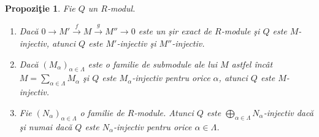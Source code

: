\documentclass[12pt,a4paper]{book}
\theoremstyle{plain}
\newtheorem{proposition}[theorem]{Propoziţie}
\theoremstyle{definition}
\theoremstyle{remark}
\begin{document}
\begin{proposition}
Fie \(Q\) un \(R\)-modul.
\begin{enumerate}
  \item Dacă \(0 \to M' \xrightarrow{f} M \xrightarrow{g} M'' \to 0\) este
        un şir exact de \(R\)-module şi \(Q\) este \(M\)-injectiv,
        atunci \(Q\) este \(M'\)-injectiv şi \(M''\)-injectiv.
  \item Dacă \((M_\alpha)_{\alpha \in \Lambda}\) este o familie de submodule ale lui \(M\)
        astfel încât \(M = \sum_{\alpha\in\Lambda} M_\alpha\) şi
        \(Q\) este \(M_\alpha\)-injectiv pentru orice \(\alpha\), atunci \(Q\) este \(M\)-injectiv.
  \item Fie \((N_\alpha)_{\alpha\in\Lambda}\) o familie de \(R\)-module.
        Atunci \(Q\) este \(\bigoplus_{\alpha\in\Lambda} N_\alpha\)-injectiv
        dacă şi numai dacă \(Q\) este \(N_\alpha\)-injectiv pentru orice \(\alpha\in\Lambda\).
\end{enumerate}
\end{proposition}
\end{document}
